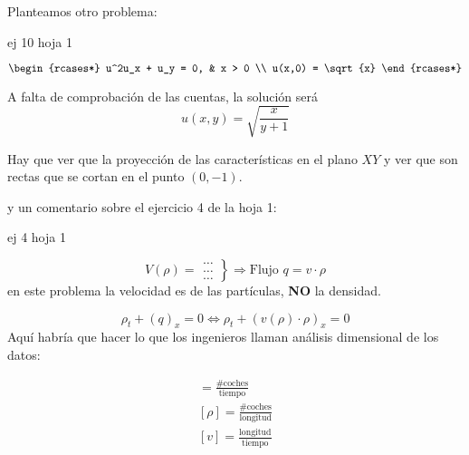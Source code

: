 	Planteamos otro problema:
	\begin{example}{ej 10 hoja 1}

		\[
		\begin{rcases*}
			u^2u_x + u_y = 0, & x > 0 \\
			u(x,0) = \sqrt{x}
		\end{rcases*}
		 \]

		A falta de comprobación de las cuentas, la solución será \[u(x,y) = \sqrt{\frac{x}{y+1}} \]

		Hay que ver que la proyección de las características en el plano $XY$ y ver que son rectas que se cortan en el punto $(0,-1)$.

	\end{example}

	y un comentario sobre el ejercicio 4 de la hoja 1:

	\begin{example}{ej 4 hoja 1}

		\[ V(\rho) =
		\left.
		\begin{array}{l}
			… \\
			… \\
			…
		\end{array}
		\right\} \Rightarrow \text{Flujo } q = v \cdot \rho
		\]
		\obs en este problema la velocidad es de las partículas, {\bf NO} la densidad.

		$$\rho_t + (q)_x = 0 \iff \rho_t + (v(\rho) \cdot \rho)_x = 0$$
		Aquí habría que hacer lo que los ingenieros llaman análisis dimensional de los datos:

		\begin{gather*}
		[y] = \frac{\text{\# coches}}{\text{tiempo}}\\
		[\rho] = \frac{\text{\# coches}}{\text{longitud}}\\
		[v] = \frac{\text{longitud}}{\text{tiempo}}
		\end{gather*}



	\end{example}

